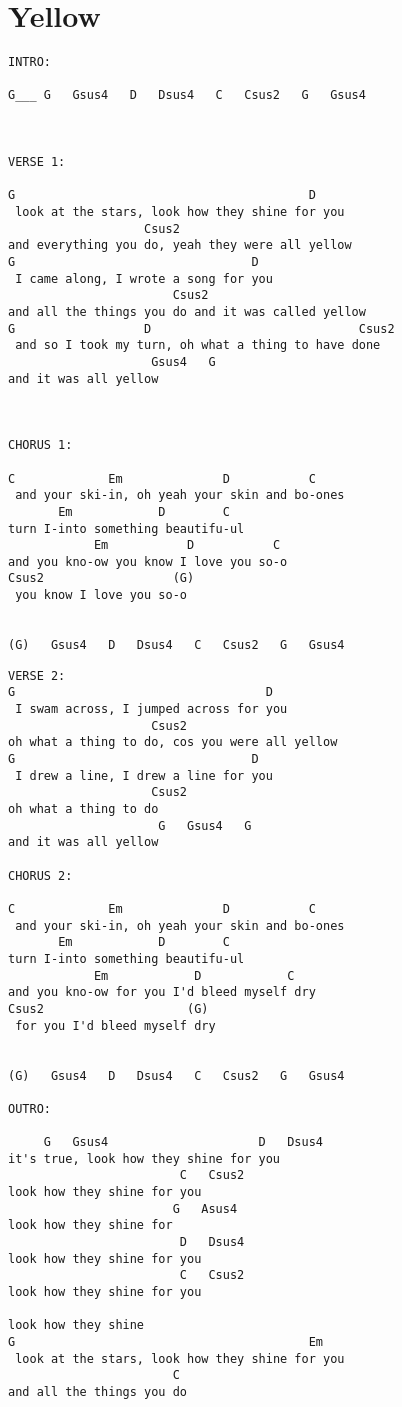 \documentclass[leqno]{memoir}
\begin{document}
\chapter{Yellow}
\begin{verbatim}
INTRO:

G___ G   Gsus4   D   Dsus4   C   Csus2   G   Gsus4



VERSE 1:

G                                         D
 look at the stars, look how they shine for you
                   Csus2
and everything you do, yeah they were all yellow
G                                 D
 I came along, I wrote a song for you
                       Csus2
and all the things you do and it was called yellow
G                  D                             Csus2
 and so I took my turn, oh what a thing to have done
                    Gsus4   G
and it was all yellow



CHORUS 1:

C             Em              D           C
 and your ski-in, oh yeah your skin and bo-ones
       Em            D        C
turn I-into something beautifu-ul
            Em           D           C                       
and you kno-ow you know I love you so-o
Csus2                  (G)
 you know I love you so-o


(G)   Gsus4   D   Dsus4   C   Csus2   G   Gsus4

\end{verbatim}
\newpage
\begin{verbatim}
VERSE 2:
G                                   D
 I swam across, I jumped across for you
                    Csus2
oh what a thing to do, cos you were all yellow
G                                 D
 I drew a line, I drew a line for you
                    Csus2
oh what a thing to do
                     G   Gsus4   G
and it was all yellow

CHORUS 2:

C             Em              D           C
 and your ski-in, oh yeah your skin and bo-ones
       Em            D        C
turn I-into something beautifu-ul
            Em            D            C                       
and you kno-ow for you I'd bleed myself dry
Csus2                    (G)
 for you I'd bleed myself dry


(G)   Gsus4   D   Dsus4   C   Csus2   G   Gsus4

OUTRO:

     G   Gsus4                     D   Dsus4
it's true, look how they shine for you
                        C   Csus2
look how they shine for you
                       G   Asus4
look how they shine for
                        D   Dsus4
look how they shine for you
                        C   Csus2
look how they shine for you

look how they shine
G                                         Em
 look at the stars, look how they shine for you
                       C
and all the things you do


\end{verbatim}
\newpage
\end{document}
